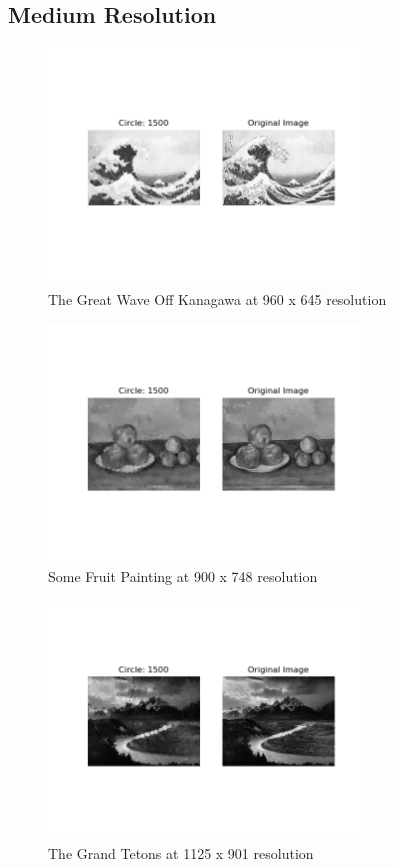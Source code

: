 \documentclass[12pt]{article}
\begin{document}
\newpage
\subsection*{Medium Resolution}
\begin{figure}[H]
\centering
\noindent\includegraphics[width=0.75\textwidth]{../results/wave/wave_1500}
\caption{The Great Wave Off Kanagawa at 960 x 645 resolution}
\end{figure}

\begin{figure}[H]
\centering
\noindent\includegraphics[width=0.75\textwidth]{../results/fruit/fruit2_1500}
\caption{Some Fruit Painting at 900 x 748 resolution}
\end{figure}

\begin{figure}[H]
\centering
\noindent\includegraphics[width=0.75\textwidth]{../results/ansel/tetons_1500}
\caption{The Grand Tetons at 1125 x 901 resolution}
\end{figure}
\end{document}
